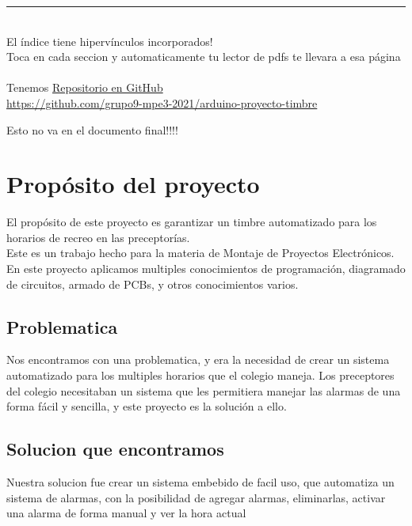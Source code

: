 \documentclass{article}
\begin{document}
\tableofcontents		\noindent\rule{\textwidth}{0.7pt}
\\ El índice tiene hipervínculos incorporados!\\ 
Toca en cada seccion y automaticamente tu lector de pdfs te llevara a esa página\\\\
{\large Tenemos 
\href{https://github.com/grupo9-mpe3-2021/arduino-proyecto-timbre}{Repositorio en GitHub}}\\
{\small \url{ https://github.com/grupo9-mpe3-2021/arduino-proyecto-timbre}}


\listoftodos		%
 {\huge Esto no va en el documento final!!!!}



\section{Propósito del proyecto}
El propósito de este proyecto es garantizar un timbre automatizado para los horarios de 
recreo en las preceptorías. \\
Este es un trabajo hecho para la materia de Montaje de Proyectos Electrónicos.
En este proyecto aplicamos multiples conocimientos de programación, diagramado de 
circuitos, armado de PCBs, y otros conocimientos varios.

	\subsection{Problematica}
	Nos encontramos con una problematica, y era la necesidad de crear un sistema 
	automatizado para los multiples horarios que el colegio maneja.
	Los preceptores del colegio necesitaban un sistema que les permitiera manejar las
	alarmas de una forma fácil y sencilla, y este proyecto es la solución a ello.

	\subsection{Solucion que encontramos}
	Nuestra solucion fue crear un sistema embebido de facil uso, que automatiza un sistema 
	de alarmas, con la posibilidad de agregar alarmas, eliminarlas, activar una alarma de 
	forma manual y ver la hora actual
\end{document}
